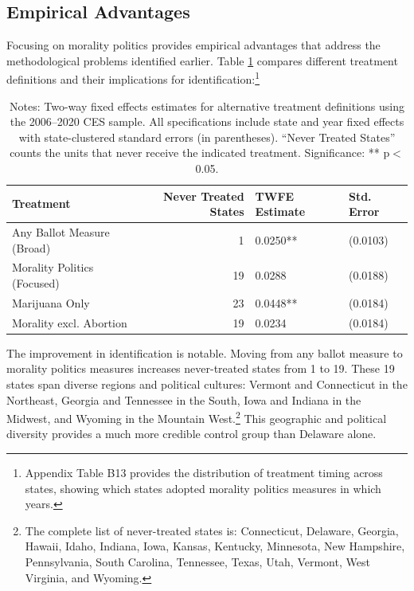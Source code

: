 \documentclass[12pt,letterpaper,oneside]{book}
\begin{document}
\subsection{Empirical Advantages}

Focusing on morality politics provides empirical advantages that address the methodological problems identified earlier. Table \ref{tab:treatment_comparison} compares different treatment definitions and their implications for identification:\footnote{Appendix Table B13 provides the distribution of treatment timing across states, showing which states adopted morality politics measures in which years.}

\begin{table}[H]
\centering
\caption{Comparison of Treatment Definitions}
\label{tab:treatment_comparison}
\caption*{\footnotesize Notes: Two-way fixed effects estimates for alternative treatment definitions using the 2006--2020 CES sample. All specifications include state and year fixed effects with state-clustered standard errors (in parentheses). ``Never Treated States'' counts the units that never receive the indicated treatment. Significance: ** p$<$0.05.}
\begin{tabular}{lrll}
  \toprule
Treatment & Never Treated States & TWFE Estimate & Std. Error \\
  \midrule
Any Ballot Measure (Broad) & 1 & 0.0250** & (0.0103) \\
  Morality Politics (Focused) & 19 & 0.0288 & (0.0188) \\
  Marijuana Only & 23 & 0.0448** & (0.0184) \\
  Morality excl. Abortion & 19 & 0.0234 & (0.0184) \\
   \bottomrule
\end{tabular}
\end{table}

The improvement in identification is notable. Moving from any ballot measure to morality politics measures increases never-treated states from 1 to 19. These 19 states span diverse regions and political cultures: Vermont and Connecticut in the Northeast, Georgia and Tennessee in the South, Iowa and Indiana in the Midwest, and Wyoming in the Mountain West.\footnote{The complete list of never-treated states is: Connecticut, Delaware, Georgia, Hawaii, Idaho, Indiana, Iowa, Kansas, Kentucky, Minnesota, New Hampshire, Pennsylvania, South Carolina, Tennessee, Texas, Utah, Vermont, West Virginia, and Wyoming.} This geographic and political diversity provides a much more credible control group than Delaware alone.
\end{document}
